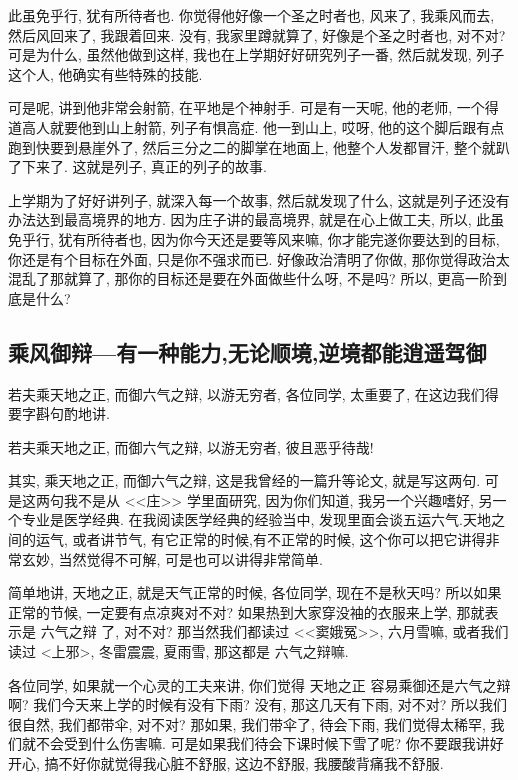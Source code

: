 \documentclass[11pt]{article}
\begin{document}
{\color{blue}此虽免乎行, 犹有所待者也}. 你觉得他好像一个圣之时者也, 风来了, 我乘风而去, 然后风回来了, 我跟着回来. 没有, 我家里蹲就算了, 好像是个圣之时者也, 对不对? 可是为什么, 虽然他做到这样, 我也在上学期好好研究列子一番, 然后就发现, 列子这个人, 他确实有些特殊的技能. 

可是呢, 讲到他非常会射箭, 在平地是个神射手. 可是有一天呢, 他的老师, 一个得道高人就要他到山上射箭, 列子有惧高症. 他一到山上, 哎呀, 他的这个脚后跟有点跑到快要到悬崖外了, 然后三分之二的脚掌在地面上, 他整个人发都冒汗, 整个就趴了下来了. 这就是列子, 真正的列子的故事.

上学期为了好好讲列子, 就深入每一个故事, 然后就发现了什么, 这就是列子还没有办法达到最高境界的地方. 因为庄子讲的最高境界, 就是在心上做工夫, 所以, {\color{blue}此虽免乎行, 犹有所待者也}, 因为你今天还是要等风来嘛, 你才能完遂你要达到的目标, 你还是有个目标在外面, 只是你不强求而已. 好像政治清明了你做, 那你觉得政治太混乱了那就算了, 那你的目标还是要在外面做些什么呀, 不是吗? 所以, 更高一阶到底是什么?

\subsection{\kaishu 乘风御辩---有一种能力,无论顺境,逆境都能逍遥驾御}

{\color{blue} 若夫乘天地之正, 而御六气之辩, 以游无穷者}, 各位同学, 太重要了, 在这边我们得要字斟句酌地讲.

\begin{center}
	{\color{magenta} 若夫乘天地之正, 而御六气之辩, 以游无穷者, 彼且恶乎待哉!}
\end{center}

\vspace{-0.5cm}

其实, {\color{blue} 乘天地之正, 而御六气之辩}, 这是我曾经的一篇升等论文, 就是写这两句. 可是这两句我不是从 <<庄>> 学里面研究, 因为你们知道, 我另一个兴趣嗜好, 另一个专业是医学经典. 在我阅读医学经典的经验当中, 发现里面会谈五运六气.天地之间的运气, 或者讲节气, 有它正常的时候,有不正常的时候, 这个你可以把它讲得非常玄妙, 当然觉得不可解, 可是也可以讲得非常简单.

简单地讲, {\color{blue} 天地之正}, 就是天气正常的时候, 各位同学, 现在不是秋天吗? 所以如果正常的节候, 一定要有点凉爽对不对? 如果热到大家穿没袖的衣服来上学, 那就表示是{\color{blue} 六气之辩}
了, 对不对? 那当然我们都读过 <<窦娥冤>>, 六月雪嘛, 或者我们读过 <上邪>, 冬雷震震, 夏雨雪, 那这都是 {\color{blue} 六气之辩}嘛.

各位同学, 如果就一个心灵的工夫来讲, 你们觉得 {\color{blue} 天地之正} 容易乘御还是{\color{blue}六气之辩} 啊? 我们今天来上学的时候有没有下雨? 没有, 那这几天有下雨, 对不对? 所以我们很自然, 我们都带伞, 对不对? 那如果, 我们带伞了, 待会下雨, 我们觉得太稀罕, 我们就不会受到什么伤害嘛. 可是如果我们待会下课时候下雪了呢? 你不要跟我讲好开心, 搞不好你就觉得我心脏不舒服, 这边不舒服, 我腰酸背痛我不舒服. 
\end{document}
